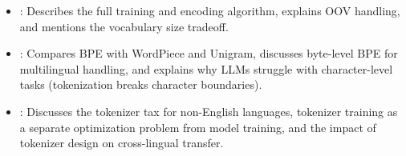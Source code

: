 \begin{interviewq}

\goodgreat
\begin{itemize}
    \item {}: Describes the full training and encoding algorithm, explains
          OOV handling, and mentions the vocabulary size tradeoff.
    \item {}: Compares BPE with WordPiece and Unigram, discusses byte-level
          BPE for multilingual handling, and explains why LLMs struggle with
          character-level tasks (tokenization breaks character boundaries).
    \item {}: Discusses the tokenizer tax for non-English languages,
          tokenizer training as a separate optimization problem from model training,
          and the impact of tokenizer design on cross-lingual transfer.
\end{itemize}

\end{interviewq}

\vspace{0.5em}

